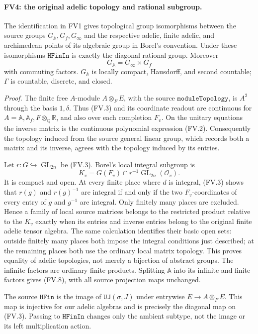 \paragraph{FV4: the original adelic topology and rational subgroup.}
\label{claim:FV4}
The identification in FV1 gives topological group isomorphisms
between the source groups \(G_{\mathbb A},G_f,G_\infty\) and the
respective adelic, finite adelic, and archimedean points of its
algebraic group in Borel's convention.  Under these isomorphisms
\(\texttt{HFinIn}\) is exactly the diagonal rational group.  Moreover
\[
 G_{\mathbb A}=G_\infty\times G_f
 \tag{FV.8}
\]
with commuting factors.  \(G_{\mathbb A}\) is locally compact,
Hausdorff, and second countable; \(\Gamma\) is countable, discrete,
and closed.

\emph{Proof.}
The finite free \(A\)-module \(A\otimes_FE\), with the source
\(\texttt{moduleTopology}\), is \(A^2\) through the basis \(1,\delta\).
Thus (FV.3) and its coordinate readout are continuous for
\(A=\mathbb A,\mathbb A_f,F\otimes_{\mathbb Q}\mathbb R\), and also
over each completion \(F_v\).  On the unitary equations the inverse
matrix is the continuous polynomial expression (FV.2).  Consequently
the topology induced from the source general linear group, which
records both a matrix and its inverse, agrees with the topology
induced by its entries.

Let \(r:G\hookrightarrow\operatorname{GL}_{2n}\) be (FV.3).
Borel's local integral subgroup is
\[
          K_v=G(F_v)\cap r^{-1}\operatorname{GL}_{2n}(\mathcal O_v).
 \tag{FV.9}
\]
It is compact and open.  At every finite place where \(d\) is integral,
(FV.3) shows that \(r(g)\) and \(r(g)^{-1}\) are integral if and only
if the two \(F_v\)-coordinates of every entry of \(g\) and \(g^{-1}\)
are integral.  Only finitely many places are excluded.  Hence a
family of local source matrices belongs to the restricted product
relative to the \(K_v\) exactly when its entries and inverse entries
belong to the original finite adelic tensor algebra.  The same
calculation identifies their basic open sets: outside finitely many
places both impose the integral conditions just described; at the
remaining places both use the ordinary local matrix topology.
This proves equality of adelic topologies, not merely a bijection
of abstract groups.  The infinite factors are ordinary finite
products.  Splitting \(\mathbb A\) into its infinite and finite
factors gives (FV.8), with all source projection maps unchanged.

The source \(\texttt{HFin}\) is the image of
\(\texttt{UJ}(\sigma,J)\) under entrywise \(E\to A\otimes_FE\).
This map is injective for our adelic algebras and is precisely the
diagonal map on (FV.3).  Passing to \(\texttt{HFinIn}\) changes only
the ambient subtype, not the image or its left multiplication action.

